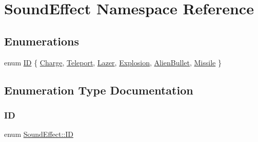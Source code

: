 \hypertarget{namespace_sound_effect}{}\section{Sound\+Effect Namespace Reference}
\label{namespace_sound_effect}
\subsection*{Enumerations}
\begin{DoxyCompactItemize}
\item 
enum \hyperlink{namespace_sound_effect_a11ffbf1eb89e85a34cbfd5a59b2cd9cb}{ID} \{ \newline
\hyperlink{namespace_sound_effect_a11ffbf1eb89e85a34cbfd5a59b2cd9cba089c46ca5650d2908d73313697639681}{Charge}, 
\hyperlink{namespace_sound_effect_a11ffbf1eb89e85a34cbfd5a59b2cd9cba704ba2e853835e27d1a7269ba15a815e}{Teleport}, 
\hyperlink{namespace_sound_effect_a11ffbf1eb89e85a34cbfd5a59b2cd9cba5ffead776f4775d199243408e408a7e1}{Lazer}, 
\hyperlink{namespace_sound_effect_a11ffbf1eb89e85a34cbfd5a59b2cd9cba67b990b7e72c8a371574775b9c007c0c}{Explosion}, 
\newline
\hyperlink{namespace_sound_effect_a11ffbf1eb89e85a34cbfd5a59b2cd9cba641cefad0985cde466d6de37d5b020d1}{Alien\+Bullet}, 
\hyperlink{namespace_sound_effect_a11ffbf1eb89e85a34cbfd5a59b2cd9cba790398f6a6f4c296cd5d437c2a8c8da5}{Missile}
 \}
\end{DoxyCompactItemize}


\subsection{Enumeration Type Documentation}
\mbox{\label{namespace_sound_effect_a11ffbf1eb89e85a34cbfd5a59b2cd9cb}} 
\subsubsection{\texorpdfstring{ID}{ID}}
{\footnotesize\ttfamily enum \hyperlink{namespace_sound_effect_a11ffbf1eb89e85a34cbfd5a59b2cd9cb}{Sound\+Effect\+::\+ID}}

